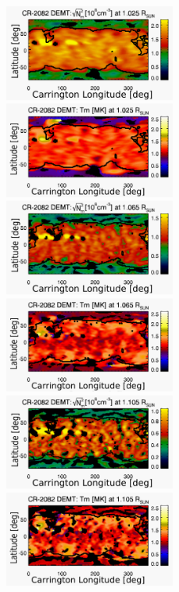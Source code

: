 \documentclass[namedreferences]{solarphysics}
\begin{document}
\begin{article}
\begin{figure}[h!]
\begin{center}
\includegraphics[width=0.495\textwidth]{map_Ne_CR2082_DEMT-EUVI_behind_H1-L3523_r3d_1025_Rsun2.pdf}
\includegraphics[width=0.495\textwidth]{map_Tm_CR2082_DEMT-EUVI_behind_H1-L3523_r3d_1025_Rsun2.pdf}
\includegraphics[width=0.495\textwidth]{map_Ne_CR2082_DEMT-EUVI_behind_H1-L3523_r3d_1065_Rsun2.pdf}
\includegraphics[width=0.495\textwidth]{map_Tm_CR2082_DEMT-EUVI_behind_H1-L3523_r3d_1065_Rsun2.pdf}
\includegraphics[width=0.495\textwidth]{map_Ne_CR2082_DEMT-EUVI_behind_H1-L3523_r3d_1105_Rsun2.pdf}
\includegraphics[width=0.495\textwidth]{map_Tm_CR2082_DEMT-EUVI_behind_H1-L3523_r3d_1105_Rsun2.pdf}

\end{center}
\end{figure}
\end{article}
\end{document}

